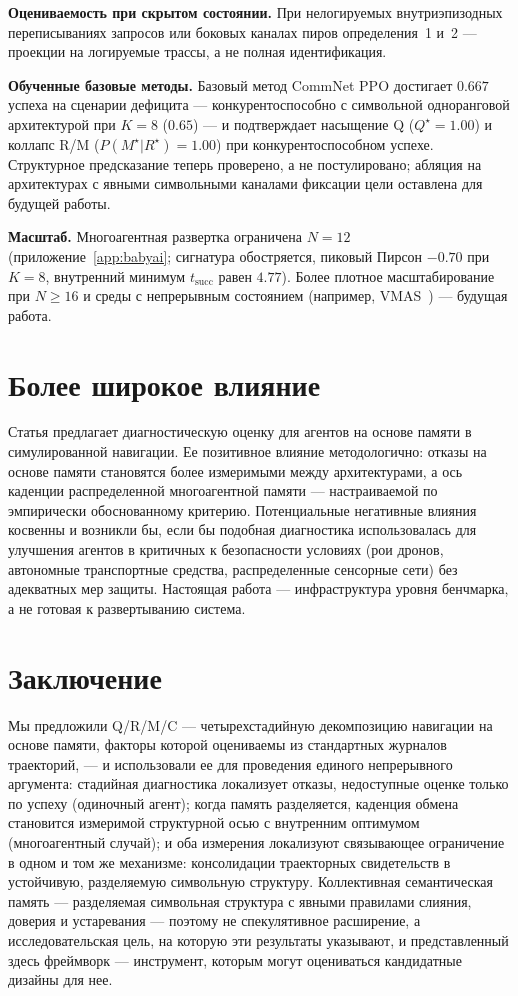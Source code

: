 \documentclass{article}
\begin{document}
\textbf{Оцениваемость при скрытом состоянии.} При нелогируемых внутриэпизодных переписываниях запросов или боковых каналах пиров определения~1 и~2 --- проекции на логируемые трассы, а не полная идентификация.

\textbf{Обученные базовые методы.} Базовый метод CommNet PPO достигает $0.667$ успеха на сценарии дефицита --- конкурентоспособно с символьной одноранговой архитектурой при $K{=}8$ ($0.65$) --- и подтверждает насыщение Q ($Q^\star{=}1.00$) и коллапс R/M ($P(M^\star|R^\star){=}1.00$) при конкурентоспособном успехе. Структурное предсказание теперь проверено, а не постулировано; абляция на архитектурах с явными символьными каналами фиксации цели оставлена для будущей работы.

\textbf{Масштаб.} Многоагентная развертка ограничена $N{=}12$ (приложение~\ref{app:babyai}; сигнатура обостряется, пиковый Пирсон $-0.70$ при $K{=}8$, внутренний минимум $t_{\mathrm{succ}}$ равен $4.77$). Более плотное масштабирование при $N{\ge}16$ и среды с непрерывным состоянием (например, VMAS~\citep{bettini2022vmas}) --- будущая работа.

\section{Более широкое влияние}

Статья предлагает диагностическую оценку для агентов на основе памяти в симулированной навигации. Ее позитивное влияние методологично: отказы на основе памяти становятся более измеримыми между архитектурами, а ось каденции распределенной многоагентной памяти --- настраиваемой по эмпирически обоснованному критерию. Потенциальные негативные влияния косвенны и возникли бы, если бы подобная диагностика использовалась для улучшения агентов в критичных к безопасности условиях (рои дронов, автономные транспортные средства, распределенные сенсорные сети) без адекватных мер защиты. Настоящая работа --- инфраструктура уровня бенчмарка, а не готовая к развертыванию система.

\section{Заключение}

Мы предложили Q/R/M/C --- четырехстадийную декомпозицию навигации на основе
памяти, факторы которой оцениваемы из стандартных журналов траекторий, ---
и использовали ее для проведения единого непрерывного аргумента: стадийная диагностика
локализует отказы, недоступные оценке только по успеху (одиночный агент);
когда память разделяется, каденция обмена становится измеримой
структурной осью с внутренним оптимумом (многоагентный случай); и оба
измерения локализуют связывающее ограничение в одном и том же механизме:
консолидации траекторных свидетельств в устойчивую, разделяемую
символьную структуру. Коллективная семантическая память --- разделяемая символьная
структура с явными правилами слияния, доверия и устаревания ---
поэтому не спекулятивное расширение, а исследовательская цель, на которую эти
результаты указывают, и представленный здесь фреймворк --- инструмент,
которым могут оцениваться кандидатные дизайны для нее.
\end{document}
